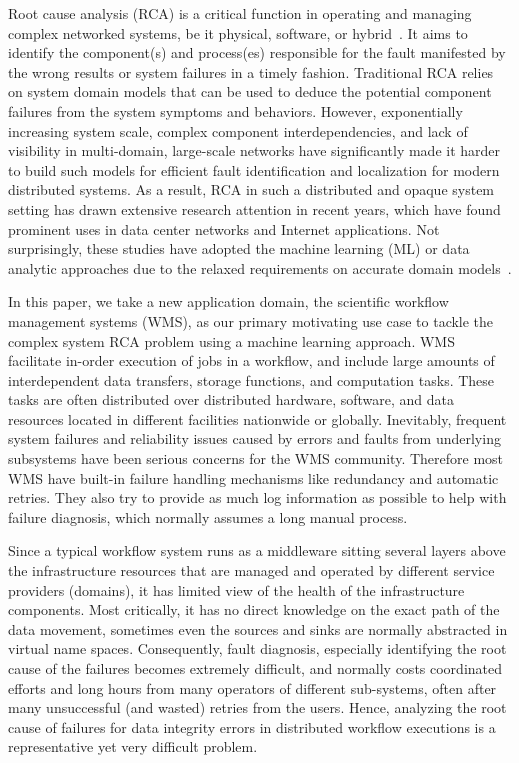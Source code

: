 Root cause analysis (RCA) is a critical function in operating and managing complex networked systems, be it physical, software, or hybrid~\cite{RCA-Review-2017}.
It aims to identify the component(s) and process(es) responsible for the fault manifested by the wrong results or system failures in a timely fashion.
Traditional RCA relies on system domain models that can be used to deduce the potential component failures from the system symptoms and behaviors.
However, exponentially increasing system scale, complex component interdependencies, and lack of visibility in multi-domain, large-scale networks have 
significantly made it harder to build such models for efficient fault identification and localization for modern distributed systems. 
As a result, RCA in such a distributed and opaque system setting has drawn extensive research attention in recent years, which have found prominent uses in data center networks 
and Internet applications. Not surprisingly, these studies have adopted the machine learning (ML) or data analytic approaches
due to the relaxed requirements on accurate domain models~\cite{netbouncer:nsdi18,Link-JIoT-2019}.

In this paper, we take a new application domain, the scientific workflow management systems (WMS), as our primary motivating use case to tackle the complex system RCA problem 
using a machine learning approach. WMS facilitate in-order execution of jobs in a workflow, and include large amounts of interdependent data transfers, storage functions, and computation tasks. 
These tasks are often distributed over distributed hardware, software, and data resources located in different facilities nationwide or globally. 
Inevitably, frequent system failures and reliability issues 
caused by errors and faults from underlying subsystems have been serious concerns for the WMS community. 
Therefore most WMS have built-in failure handling mechanisms like redundancy and automatic retries. 
They also try to provide as much log information as possible to help with failure diagnosis, which normally assumes a long manual process.

Since a typical workflow system runs as a middleware sitting several layers above the infrastructure resources that are managed 
and operated by different service providers (domains), it has limited view of the health of the infrastructure components. 
Most critically, it has no direct knowledge on the exact path of the data movement,
sometimes even the sources and sinks are normally abstracted in virtual name spaces.  
Consequently, fault diagnosis, especially identifying the root cause of the failures becomes extremely difficult, and normally 
costs coordinated efforts and long hours from many operators of different sub-systems, often after many unsuccessful (and wasted) retries from the users. 
Hence, analyzing the root cause of failures for data integrity errors in distributed workflow executions is a representative yet very difficult problem.

